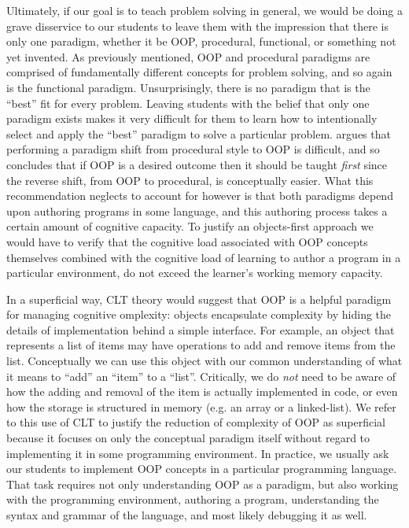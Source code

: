 \documentclass[12pt]{article}
\begin{document}
Ultimately, if our goal is to teach problem solving in general, we
would be doing a grave disservice to our students to leave them with
the impression that there is only one paradigm, whether it be OOP,
procedural, functional, or something not yet invented. As previously
mentioned, OOP and procedural paradigms are comprised of fundamentally
different concepts for problem solving, and so again is the functional
paradigm. Unsurprisingly, there is no paradigm that is the ``best''
fit for every problem. Leaving students with the belief that only one
paradigm exists makes it very difficult for them to learn how to
intentionally select and apply the ``best'' paradigm to solve a
particular problem. \citeauthor{kolling_problem_1999} argues that
performing a paradigm shift from procedural style to OOP is difficult,
and so concludes that if OOP is a desired outcome then it should be
taught \emph{first} since the reverse shift, from OOP to procedural,
is conceptually easier. What this recommendation neglects to account
for however is that both paradigms depend upon authoring programs in
some language, and this authoring process takes a certain amount of
cognitive capacity. To justify an objects-first approach we would have
to verify that the cognitive load associated with OOP concepts
themselves combined with the cognitive load of learning to author a
program in a particular environment, do not exceed the learner's
working memory capacity.

In a superficial way, CLT theory would suggest that OOP is a helpful
paradigm for managing cognitive omplexity: objects encapsulate
complexity by hiding the details of implementation behind a simple
interface. For example, an object that represents a list of items may
have operations to add and remove items from the list. Conceptually we
can use this object with our common understanding of what it means to
``add'' an ``item'' to a ``list''. Critically, we do \emph{not} need
to be aware of how the adding and removal of the item is actually
implemented in code, or even how the storage is structured in memory
(e.g. an array or a linked-list). We refer to this use of CLT to
justify the reduction of complexity of OOP as superficial because it
focuses on only the conceptual paradigm itself without regard to
implementing it in some programming environment. In practice, we
usually ask our students to implement OOP concepts in a particular
programming language. That task requires not only understanding OOP as
a paradigm, but also working with the programming environment,
authoring a program, understanding the syntax and grammar of the
language, and most likely debugging it as well.
\end{document}
